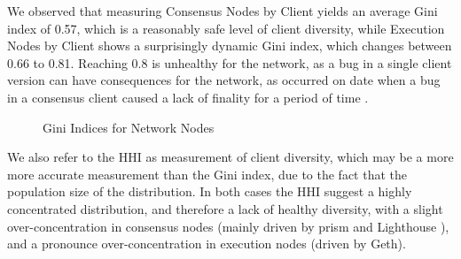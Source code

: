 \documentclass[conference]{IEEEtran}
\begin{document}
We observed that measuring Consensus Nodes by Client yields an average Gini index of 0.57, which is a reasonably safe level of client diversity, while Execution Nodes by Client shows a surprisingly dynamic Gini index, which changes between 0.66 to 0.81.  Reaching 0.8 is unhealthy for the network, as a bug in a single client version can have consequences for the network, as occurred on date when a bug in a consensus client caused a lack of finality for a period of time \cite{offchainlabs2023}.

\begin{figure}[ht]
\begin{center}
\end{center}
\caption{Gini Indices for Network Nodes}
\label{fig:gini index network nodes}
\end{figure}

We also refer to the HHI as measurement of client diversity, which may be a more more accurate measurement than the Gini index, due to the fact that  the population size of the distribution.  In both cases the HHI suggest a highly concentrated distribution, and therefore a lack of healthy diversity, with a slight over-concentration in consensus nodes (mainly driven by prism and Lighthouse \cite{abu2023}), and a pronounce over-concentration in execution nodes (driven by Geth).
\end{document}
